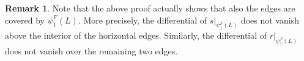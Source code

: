 \documentclass[10pt,oneside,reqno]{amsart}
\theoremstyle{definition}
\newtheorem*{remark}{Remark}
\begin{document}
\begin{remark}
    Note that the above proof actually shows that also the edges are covered by $\psi^F_1(L)$. More precisely, the differential of $s\vert_{\psi^F_1(L)}$ does not vanish above the interior of the horizontal edges. Similarly, the differential of $r\vert_{\psi^F_1(L)}$ does not vanish over the remaining two edges.
\end{remark}





\end{document}
